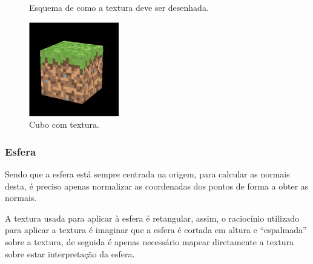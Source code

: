 \documentclass[a4paper]{article}
\begin{document}
\begin{figure}[H]
    \centering
    
    \caption{Esquema de como a textura deve ser desenhada.}
\end{figure}

\begin{figure}[H]
    \centering
    \includegraphics[width=0.35\textwidth]{box.png}
    \caption{Cubo com textura.}
\end{figure}

\subsubsection{Esfera}\label{sec:esfera}
Sendo que a esfera está sempre centrada na origem, para calcular as normais
desta, é preciso apenas normalizar as coordenadas dos pontos de forma a obter
as normais.

A textura usada para aplicar à esfera é retangular, assim, o raciocínio
utilizado para aplicar a textura é imaginar que a esfera é cortada em altura e
``espalmada'' sobre a textura, de seguida é apenas necessário mapear
diretamente a textura sobre estar interpretação da esfera.
\end{document}
